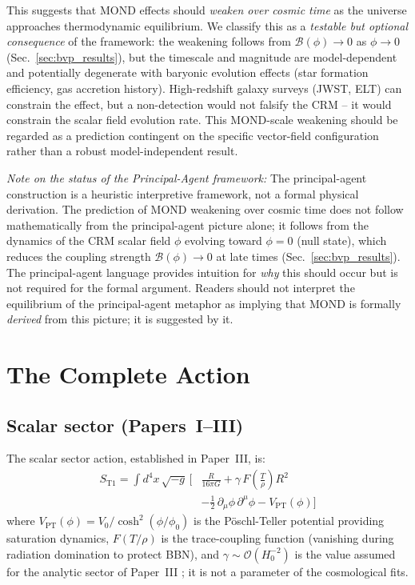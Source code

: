 \documentclass[aps,prd,twocolumn,superscriptaddress,nofootinbib]{revtex4-2}
\begin{document}
This suggests that MOND effects should \textit{weaken over cosmic time} as the universe approaches thermodynamic equilibrium. We classify this as a \emph{testable but optional consequence} of the framework: the weakening follows from $\mathcal{B}(\phi) \to 0$ as $\phi \to 0$ (Sec.~\ref{sec:bvp_results}), but the timescale and magnitude are model-dependent and potentially degenerate with baryonic evolution effects (star formation efficiency, gas accretion history). High-redshift galaxy surveys (JWST, ELT) can constrain the effect, but a non-detection would not falsify the CRM -- it would constrain the scalar field evolution rate. This MOND-scale weakening should be regarded as a prediction contingent on the specific vector-field configuration rather than a robust model-independent result.

\textit{Note on the status of the Principal-Agent framework:} The principal-agent construction is a heuristic interpretive framework, not a formal physical derivation. The prediction of MOND weakening over cosmic time does not follow mathematically from the principal-agent picture alone; it follows from the dynamics of the CRM scalar field $\phi$ evolving toward $\phi = 0$ (null state), which reduces the coupling strength $\mathcal{B}(\phi) \to 0$ at late times (Sec.~\ref{sec:bvp_results}). The principal-agent language provides intuition for \textit{why} this should occur but is not required for the formal argument. Readers should not interpret the equilibrium of the principal-agent metaphor as implying that MOND is formally \textit{derived} from this picture; it is suggested by it.


\section{The Complete Action}
\label{sec:action}

\subsection{Scalar sector (Papers~I--III)} %

The scalar sector action, established in Paper~III, is:
\begin{align}
S_{\mathrm{T1}} = \int d^4x\,\sqrt{-g}\,\bigg[&
  \frac{R}{16\pi G}
  + \gamma\,F\!\left(\frac{T}{\rho}\right) R^2
\nonumber \\
  &- \frac{1}{2}\,\partial_\mu\phi\,\partial^\mu\phi
  - V_{\mathrm{PT}}(\phi)
\bigg]
\label{eq:S_T1}
\end{align}
where $V_{\mathrm{PT}}(\phi) = V_0/\cosh^2(\phi/\phi_0)$ is the P\"oschl-Teller potential providing saturation dynamics, $F(T/\rho)$ is the trace-coupling function (vanishing during radiation domination to protect BBN), and $\gamma \sim \mathcal{O}(H_0^{-2})$ is the value assumed for the analytic sector of Paper~III \cite{Geiger2026c}; it is not a parameter of the cosmological fits.
\end{document}
